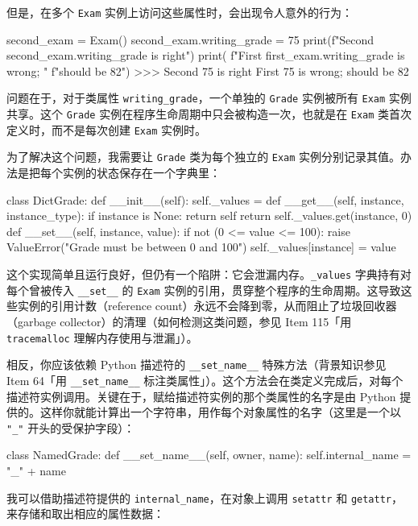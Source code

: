 但是，在多个 \texttt{Exam} 实例上访问这些属性时，会出现令人意外的行为：

\begin{codebox}[python]
second_exam = Exam()
second_exam.writing_grade = 75
print(f"Second {second_exam.writing_grade} is right")
print( f"First  {first_exam.writing_grade} is wrong; "
f"should be 82")
>>>
Second 75 is right
First  75 is wrong; should be 82
\end{codebox}

问题在于，对于类属性 \texttt{writing\_grade}，一个单独的 \texttt{Grade} 实例被所有 \texttt{Exam} 实例共享。这个 \texttt{Grade} 实例在程序生命周期中只会被构造一次，也就是在 \texttt{Exam} 类首次定义时，而不是每次创建 \texttt{Exam} 实例时。

为了解决这个问题，我需要让 \texttt{Grade} 类为每个独立的 \texttt{Exam} 实例分别记录其值。办法是把每个实例的状态保存在一个字典里：

\begin{codebox}[python]
class DictGrade:
    def __init__(self):
        self._values = {}
    def __get__(self, instance, instance_type):
        if instance is None:
            return self
        return self._values.get(instance, 0)
    def __set__(self, instance, value):
        if not (0 <= value <= 100):
            raise ValueError("Grade must be between 0 and 100")
        self._values[instance] = value
\end{codebox}

这个实现简单且运行良好，但仍有一个陷阱：它会泄漏内存。\texttt{\_values} 字典持有对每个曾被传入 \texttt{\_\_set\_\_} 的 \texttt{Exam} 实例的引用，贯穿整个程序的生命周期。这导致这些实例的引用计数（reference count）永远不会降到零，从而阻止了垃圾回收器（garbage collector）的清理（如何检测这类问题，参见 Item 115「用 \texttt{tracemalloc} 理解内存使用与泄漏」）。

相反，你应该依赖 Python 描述符的 \texttt{\_\_set\_name\_\_} 特殊方法（背景知识参见 Item 64「用 \texttt{\_\_set\_name\_\_} 标注类属性」）。这个方法会在类定义完成后，对每个描述符实例调用。关键在于，赋给描述符实例的那个类属性的名字是由 Python 提供的。这样你就能计算出一个字符串，用作每个对象属性的名字（这里是一个以 \texttt{"\_"} 开头的受保护字段）：

\begin{codebox}[python]
class NamedGrade:
    def __set_name__(self, owner, name):
        self.internal_name = "_" + name
\end{codebox}

我可以借助描述符提供的 \texttt{internal\_name}，在对象上调用 \texttt{setattr} 和 \texttt{getattr}，来存储和取出相应的属性数据：

